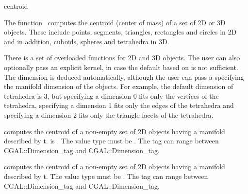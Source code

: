 
\begin{ccRefFunction}{centroid}  

\ccDefinition
  
The function \ccRefName\ computes the centroid (center of mass) of a set
of 2D or 3D objects. These include points, segments, triangles, rectangles and circles in 2D and in addition, cuboids, spheres and tetrahedra in 3D.


There is a set of overloaded  functions for 2D and 3D objects.
The user can also optionally pass an explicit kernel, in case the default based on  is not sufficient. The dimension is deduced automatically, although the user can pass a  specifying the manifold dimension of the objects. For example, the default dimension of tetrahedra is 3, but specifying a dimension 0 fits only the vertices of the tetrahedra, specifying a dimension 1 fits only the edges of the tetrahedra and specifying a dimension 2 fits only the triangle facets of the tetrahedra.

{ computes the centroid of a non-empty set of 2D objects having a manifold described by t.
   is .  The value type must be . The tag can range between CGAL::Dimension_tag\> and CGAL::Dimension_tag\>.
 }

{ computes the centroid of a non-empty set of 2D objects having a manifold described by t.
  The value type must be . The tag can range between CGAL::Dimension_tag\> and CGAL::Dimension_tag\>.
 }


\end{ccRefFunction}
